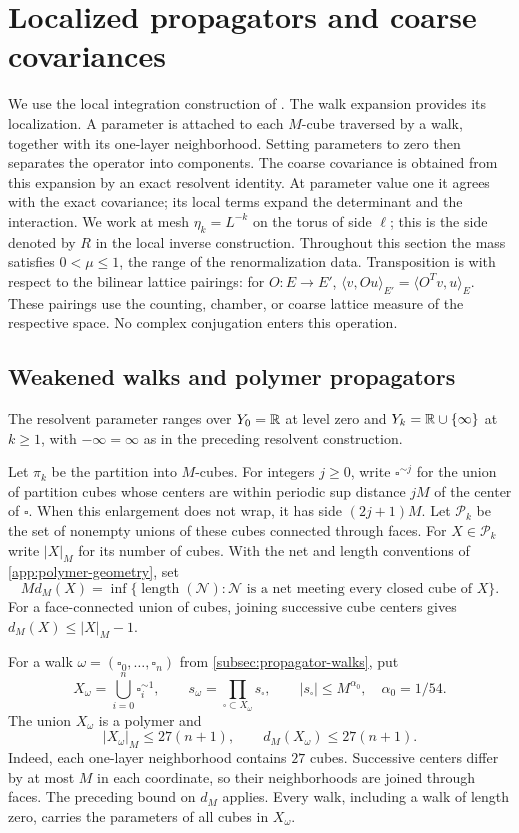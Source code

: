 \section{Localized propagators and coarse covariances}\label{sec:fermion-primitives}

We use the local integration construction of \cite[Section~11]{QED3Manuscript}. The walk expansion provides its localization. A parameter is attached to each $M$-cube traversed
by a walk, together with its one-layer neighborhood. Setting parameters
to zero then separates the operator into components. The coarse
covariance is obtained from this expansion by an exact resolvent
identity. At parameter value one it agrees with the exact covariance;
its local terms expand the determinant and the interaction.
We work at mesh $\eta_k=L^{-k}$ on the torus of side $\ell$; this is
the side denoted by $R$ in the local inverse construction.
Throughout this section the mass satisfies $0<\mu\le1$,
the range of the renormalization data.
Transposition is with respect to the bilinear lattice pairings:
for $O:E\to E'$, $\langle v,Ou\rangle_{E'}=
\langle O^Tv,u\rangle_E$. These pairings use the counting,
chamber, or coarse lattice measure of the respective space.
No complex conjugation enters this operation.

\subsection{Weakened walks and polymer propagators}\label{subsec:weakened-walks}

The resolvent parameter ranges over $Y_0=\mathbb R$ at level zero and
$Y_k=\mathbb R\cup\{\infty\}$ at $k\ge1$, with $-\infty=\infty$
as in the preceding resolvent construction.

Let $\pi_k$ be the partition into $M$-cubes. For integers $j\ge0$, write
$\square^{\sim j}$ for the union of partition cubes whose centers
are within periodic sup distance $jM$ of the center of $\square$.
When this enlargement does not wrap, it has side $(2j+1)M$.
Let $\mathcal P_k$ be the set of
nonempty unions of these cubes connected through faces. For $X\in\mathcal P_k$
write $|X|_M$ for its number of cubes. With the net and length
conventions of \cref{app:polymer-geometry}, set
\[
 M d_M(X)=\inf\{\operatorname{length}(\mathcal N):
       \mathcal N\text{ is a net meeting every closed cube of }X\}.
\]
For a face-connected union of cubes, joining successive cube centers gives
$d_M(X)\le |X|_M-1$.

For a walk $\omega=(\square_0,\ldots,\square_n)$ from
\cref{subsec:propagator-walks}, put
\[
 X_\omega=\bigcup_{i=0}^n\square_i^{\sim1},\qquad
 s_\omega=\prod_{\square\subset X_\omega}s_\square,
 \qquad |s_\square|\le M^{\alpha_0},\quad \alpha_0=1/54.
\]
The union $X_\omega$ is a polymer and
\begin{equation}\label{eq:walk-polymer-size}
 |X_\omega|_M\le27(n+1),\qquad d_M(X_\omega)\le27(n+1).
\end{equation}
Indeed, each one-layer neighborhood contains $27$ cubes. Successive
centers differ by at most $M$ in each coordinate, so their neighborhoods
are joined through faces. The preceding bound on $d_M$ applies.
Every walk, including a walk of length zero, carries the parameters of
all cubes in $X_\omega$.

